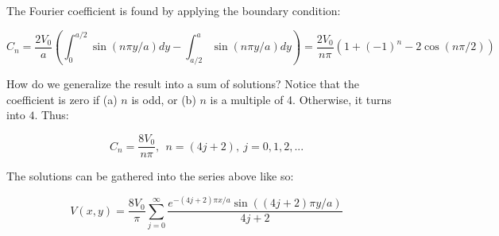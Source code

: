 \documentclass[10pt]{article}
\begin{document}
The Fourier coefficient is found by applying the boundary condition:

\begin{equation}
C_n = \frac{2V_0}{a} \left( \int_0^{a/2} \sin(n\pi y/a) dy - \int_{a/2}^{a} \sin(n\pi y/a) dy\right) = \frac{2 V_0}{n\pi}(1+(-1)^n - 2\cos(n\pi/2))
\end{equation}

How do we generalize the result into a sum of solutions?  Notice that the coefficient is zero if (a) $n$ is odd, or (b) $n$ is a multiple of 4.  Otherwise, it turns into $4$.  Thus:

\begin{equation}
C_n = \frac{8V_0}{n\pi}, ~~ n = (4j+2), ~ j = 0,1,2, ...
\end{equation}

The solutions can be gathered into the series above like so:

\begin{equation}
V(x,y) = \frac{8V_0}{\pi}\sum_{j=0}^{\infty} \frac{e^{-(4j+2)\pi x / a} \sin((4j+2) \pi y/a)}{4j+2}
\end{equation}
\end{document}
